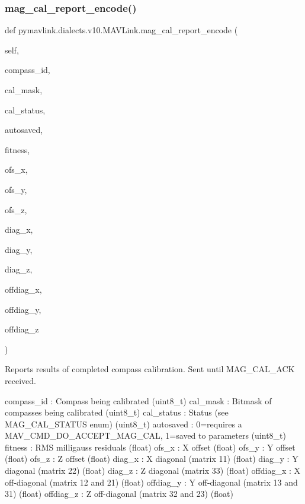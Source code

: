 \begin{DoxyVerb}
\begin{DoxyVerb}
\begin{DoxyVerb}
\begin{DoxyVerb}
\subsubsection{\texorpdfstring{mag\+\_\+cal\+\_\+report\+\_\+encode()}{mag\_cal\_report\_encode()}}
{\footnotesize\ttfamily def pymavlink.\+dialects.\+v10.\+M\+A\+V\+Link.\+mag\+\_\+cal\+\_\+report\+\_\+encode (\begin{DoxyParamCaption}\item[{}]{self,  }\item[{}]{compass\+\_\+id,  }\item[{}]{cal\+\_\+mask,  }\item[{}]{cal\+\_\+status,  }\item[{}]{autosaved,  }\item[{}]{fitness,  }\item[{}]{ofs\+\_\+x,  }\item[{}]{ofs\+\_\+y,  }\item[{}]{ofs\+\_\+z,  }\item[{}]{diag\+\_\+x,  }\item[{}]{diag\+\_\+y,  }\item[{}]{diag\+\_\+z,  }\item[{}]{offdiag\+\_\+x,  }\item[{}]{offdiag\+\_\+y,  }\item[{}]{offdiag\+\_\+z }\end{DoxyParamCaption})}

\begin{DoxyVerb}Reports results of completed compass calibration. Sent until
MAG_CAL_ACK received.

compass_id                : Compass being calibrated (uint8_t)
cal_mask                  : Bitmask of compasses being calibrated (uint8_t)
cal_status                : Status (see MAG_CAL_STATUS enum) (uint8_t)
autosaved                 : 0=requires a MAV_CMD_DO_ACCEPT_MAG_CAL, 1=saved to parameters (uint8_t)
fitness                   : RMS milligauss residuals (float)
ofs_x                     : X offset (float)
ofs_y                     : Y offset (float)
ofs_z                     : Z offset (float)
diag_x                    : X diagonal (matrix 11) (float)
diag_y                    : Y diagonal (matrix 22) (float)
diag_z                    : Z diagonal (matrix 33) (float)
offdiag_x                 : X off-diagonal (matrix 12 and 21) (float)
offdiag_y                 : Y off-diagonal (matrix 13 and 31) (float)
offdiag_z                 : Z off-diagonal (matrix 32 and 23) (float)\end{DoxyVerb}
 \mbox{\label{classpymavlink_1_1dialects_1_1v10_1_1MAVLink_ad3f38959e98a6091889f68a5e7d6e2a6}} 

\end{DoxyVerb}
\end{DoxyVerb}
\end{DoxyVerb}
\end{DoxyVerb}
